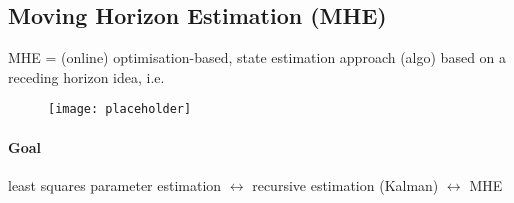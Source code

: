 \subsection{Moving Horizon Estimation (MHE)}
MHE = (online) optimisation-based, state estimation approach (algo) based on a receding horizon idea, i.e.

\begin{figure}[H]
    \centering
    \texttt{[image: placeholder]}
\end{figure}

\paragraph{Goal} least squares parameter estimation $\leftrightarrow$ recursive estimation (Kalman) $\leftrightarrow$ MHE